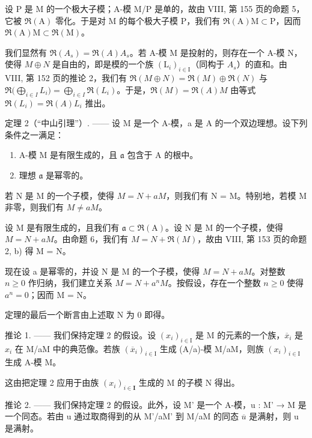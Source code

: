 设 P 是 M 的一个极大子模；A-模 M/P 是单的，故由 VIII, 第 155 页的命题 5，它被 \(\Re(\mathrm{A})\) 零化。于是对 M 的每个极大子模 P，我们有 \(\Re(\mathrm{A})\mathrm{M}\subset\mathrm{P}\)，因而 \(\Re(\mathrm{A})\mathrm{M}\subset\Re(\mathrm{M})\)。

我们显然有 \(\mathfrak{R}(A_{s})=\mathfrak{R}(A)A_{s}\)。若 A-模 M 是投射的，则存在一个 A-模 N，使得 \(M\oplus N\) 是自由的，即是模的一个族 \((\mathrm{L}_{i})_{i\in\mathrm{I}}\)（同构于 \(A_{s}\)）的直和。由 VIII, 第 152 页的推论 2，我们有 \(\mathfrak{R}(M\oplus N)=\mathfrak{R}(M)\oplus\mathfrak{R}(N)\) 与 \(\mathfrak{R}\big(\bigoplus_{i\in I}L_{i}\big)=\bigoplus_{i\in I}\mathfrak{R}(L_{i})\)。于是，\(\mathfrak{R}(M)=\mathfrak{R}(A)M\) 由等式 \(\mathfrak{R}(L_{i})=\mathfrak{R}(A)L_{i}\) 推出。

定理 2（``中山引理''）. —— 设 M 是一个 A-模，a 是 A 的一个双边理想。设下列条件之一满足：

\begin{enumerate}
\def\labelenumi{(\roman{enumi})}
\item
  A-模 M 是有限生成的，且 \(\mathfrak{a}\) 包含于 A 的根中。
\item
  理想 \(\mathfrak{a}\) 是幂零的。
\end{enumerate}

若 N 是 M 的一个子模，使得 \(M = N + aM\)，则我们有 N = M。特别地，若模 M 非零，则我们有 \(M \neq aM\)。

设 M 是有限生成的，且我们有 \(\mathfrak{a} \subset \Re(\mathrm{A})\)。设 N 是 M 的一个子模，使得 \(M = N + aM\)。由命题 6，我们有 \(M = N + \Re(M)\)，故由 VIII, 第 153 页的命题 2, b) 得 M = N。

现在设 a 是幂零的，并设 N 是 M 的一个子模，使得 \(M = N + aM\)。对整数 \(n \geqslant 0\) 作归纳，我们建立关系 \(M = N + a^{n}M\)。按假设，存在一个整数 \(n \geqslant 0\) 使得 \(a^{n} = 0\)；因而 M = N。

定理的最后一个断言由上述取 N 为 0 即得。

推论 1. —— 我们保持定理 2 的假设。设 \((x_{i})_{i\in\mathrm{I}}\) 是 M 的元素的一个族，\(\overline{x}_{i}\) 是 \(x_{i}\) 在 M/aM 中的典范像。若族 \((\overline{x}_{i})_{i\in\mathrm{I}}\) 生成 (A/a)-模 M/aM，则族 \((x_{i})_{i\in\mathrm{I}}\) 生成 A-模 M。

这由把定理 2 应用于由族 \((x_{i})_{i\in \mathbf{I}}\) 生成的 M 的子模 N 得出。

推论 2. —— 我们保持定理 2 的假设。此外，设 M' 是一个 A-模，u : M' → M 是一个同态。若由 u 通过取商得到的从 M'/aM' 到 M/aM 的同态 \(\overline{u}\) 是满射，则 u 是满射。

